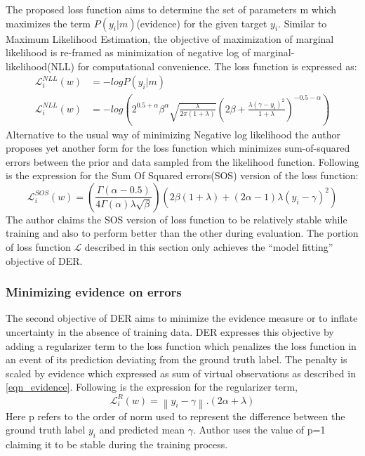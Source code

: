 	The proposed loss function aims to determine the set of parameters m which maximizes the term $P(y_i|m)$(evidence) for the given target $y_i$. Similar to Maximum Likelihood Estimation, the objective of maximization of marginal likelihood is re-framed as minimization of negative log of marginal-likelihood(NLL) for computational convenience.
	The loss function is expressed as:
	\begin{align}
		\mathcal{L}_i^{NLL}(w)&=-logP(y_i|m)\\
		\mathcal{L}_i^{NLL}(w)&= -log(2^{0.5+\alpha}\beta^\alpha\sqrt{\frac{\lambda}{2\pi(1+\lambda)}}(2\beta+\frac{\lambda(\gamma-y_i)^2}{1+\lambda})^{-0.5-\alpha})
	\end{align}
	Alternative to the usual way of minimizing Negative log likelihood the author proposes yet another form for the loss function which minimizes sum-of-squared errors between the prior and data sampled from the likelihood function. Following is the expression for the Sum Of Squared errors(SOS) version of the loss function:
	\begin{equation}
		\mathcal{L}_i^{SOS}(w)=(\frac{\Gamma(\alpha-0.5)}{4\Gamma(\alpha)\lambda\sqrt{\beta}})(2\beta(1+\lambda)+(2\alpha-1)\lambda(y_i-\gamma)^2)
	\end{equation}
	The author claims the SOS version of loss function to be relatively stable while training and also to perform better than the other during evaluation. The portion of loss function $\mathcal{L}$ described in this section only achieves the \enquote{model fitting} objective of DER. 
	
	\subsubsection{Minimizing evidence on errors}
	The second objective of DER aims to minimize the evidence measure or to inflate uncertainty in the absence of training data. DER expresses this objective by adding a regularizer term to the loss function which penalizes the loss function in an event of its prediction deviating from the ground truth label. The penalty is scaled by evidence which expressed as sum of virtual observations as described in \ref{eqn_evidence}. Following is the expression for the regularizer term,
	\begin{equation}
		\mathcal{L}_{i}^R(w) = \left\| {y_i - \gamma}\right\|.(2\alpha+\lambda)
	\end{equation}
	Here p refers to the order of norm used to represent the difference between the ground truth label $y_i$ and predicted mean $\gamma$. Author uses the value of p=1 claiming it to be stable during the training process.
	

